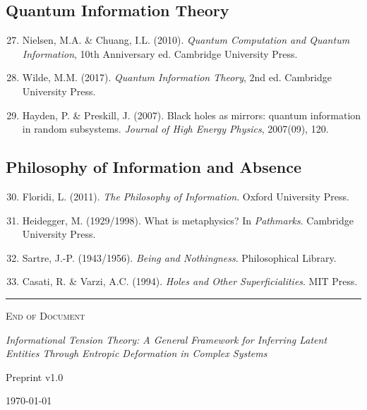 \documentclass[12pt,a4paper]{article}
\theoremstyle{definition}
\theoremstyle{remark}
\begin{document}
\subsection*{Quantum Information Theory}

\begin{enumerate}
    \setcounter{enumi}{26}
    \item Nielsen, M.A. \& Chuang, I.L. (2010). \textit{Quantum Computation and Quantum Information}, 10th Anniversary ed. Cambridge University Press.
    
    \item Wilde, M.M. (2017). \textit{Quantum Information Theory}, 2nd ed. Cambridge University Press.
    
    \item Hayden, P. \& Preskill, J. (2007). Black holes as mirrors: quantum information in random subsystems. \textit{Journal of High Energy Physics}, 2007(09), 120.
\end{enumerate}

\subsection*{Philosophy of Information and Absence}

\begin{enumerate}
    \setcounter{enumi}{29}
    \item Floridi, L. (2011). \textit{The Philosophy of Information}. Oxford University Press.
    
    \item Heidegger, M. (1929/1998). What is metaphysics? In \textit{Pathmarks}. Cambridge University Press.
    
    \item Sartre, J.-P. (1943/1956). \textit{Being and Nothingness}. Philosophical Library.
    
    \item Casati, R. \& Varzi, A.C. (1994). \textit{Holes and Other Superficialities}. MIT Press.
\end{enumerate}

\vspace{2em}

\begin{center}
\rule{0.5\textwidth}{0.4pt}
\end{center}

\vspace{1em}

\begin{center}
\textsc{End of Document}

\vspace{0.5em}

\textit{Informational Tension Theory: A General Framework for Inferring Latent Entities Through Entropic Deformation in Complex Systems}

\vspace{0.5em}

Preprint v1.0

\vspace{0.5em}

\today
\end{center}
\end{document}
